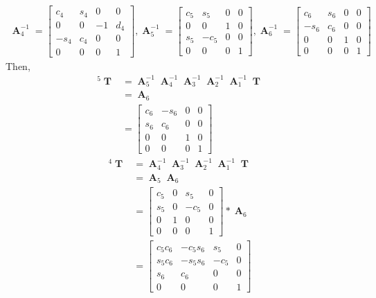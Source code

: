\documentclass[12pt]{article}
\DeclareMathOperator{\A}{\mathbf{A}}
\DeclareMathOperator{\T}{\mathbf{T}}
\begin{document}
  \begin{align*}
    \A_4^{-1} =
    \begin{bmatrix}
      c_4 & s_4 & 0 & 0\\
      0 & 0 & -1 & d_4\\
      -s_4 & c_4 & 0 & 0\\
      0 & 0 & 0 & 1
    \end{bmatrix},
    \A_5^{-1} =
    \begin{bmatrix}
      c_5 & s_5 & 0 & 0\\
      0 & 0 & 1 & 0\\
      s_5 & -c_5 & 0 & 0\\
      0 & 0 & 0 & 1
    \end{bmatrix},
    \A_6^{-1} =
    \begin{bmatrix}
      c_6 & s_6 & 0 & 0\\
      -s_6 & c_6 & 0 & 0\\
      0 & 0 & 1 & 0\\
      0 & 0 & 0 & 1
    \end{bmatrix}
  \end{align*}
  Then,
  \begin{align*}
    ^{5}\T & = \A_5^{-1}\A_4^{-1}\A_3^{-1}\A_2^{-1}\A_1^{-1}\T\\
    & = \A_6\\
    & = 
    \begin{bmatrix}
      c_6 & -s_6 & 0 & 0\\
      s_6 & c_6 & 0 & 0\\
      0 & 0 & 1 & 0\\
      0 & 0 & 0 & 1
    \end{bmatrix}
  \end{align*}
  \begin{align*}
  ^{4}\T & = \A_4^{-1}\A_3^{-1}\A_2^{-1}\A_1^{-1}\T\\
    & = \A_5\A_6\\
    & =
    \begin{bmatrix}
      c_5 & 0 & s_5 & 0\\
      s_5 & 0 & -c_5 & 0\\
      0 & 1 & 0 & 0\\
      0 & 0 & 0 & 1
    \end{bmatrix} * \A_6\\
    & =
    \begin{bmatrix}
      c_5c_6 & -c_5s_6 & s_5 & 0\\
      s_5c_6 & -s_5s_6 & -c_5 & 0\\
      s_6 & c_6 & 0 & 0\\
      0 & 0 & 0 & 1
    \end{bmatrix}
  \end{align*}
\end{document}
